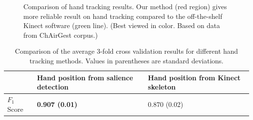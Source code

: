 \begin{figure}
\centering
{}
\caption{Comparison of hand tracking results. Our method (red region) gives more
reliable result on hand tracking compared to the off-the-shelf Kinect software
(green line). (Best viewed in color. Based on data from ChAirGest
corpus.)}
\label{fig:compare-skeleton}
\end{figure}

\begin{table}[h]
\begin{center}
\begin{tabular}{|l|p{5cm}|p{5cm}|}
\hline
 & Hand position from salience detection & Hand position
 from Kinect skeleton \\
\hline
$F_1$ Score & \textbf{0.907 (0.01)} & 0.870 (0.02) \\
\hline
\end{tabular}
\caption{Comparison of the average 3-fold cross validation results for different
hand tracking methods. Values in parentheses are standard deviations.}
\label{tab:comp-tracking}
\end{center}
\end{table}

